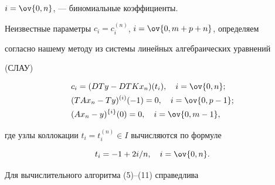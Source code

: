 $i=\ov{0,n}$, --- биномиальные коэффициенты. 


Неизвестные параметры $c_i=c^{(n)}_i$, $i=\ov{0,m+p+n}$, определяем 


согласно нашему методу из системы линейных алгебраических уравнений 


(СЛАУ) 


\begin{align} 


& c_i=(D T y-D T K x_n)(t_i),\quad i=\ov{0,n};\notag \\ 


& (T A x_n-T y)^{(i)}(-1)=0,\quad i=\ov{0,p-1};\\ 


& (A x_n-y)^{\{i\}}(0)=0,\quad i=\ov{0,m-1},\notag 


\end{align} 


где узлы коллокации $t_i=t^{(n)}_i\in I$ вычисляются по формуле 


\begin{equation} 


t_i=-1+2i/n,\quad i=\ov{0,n}. 


\end{equation} 


 


Для вычислительного алгоритма (5)--(11) справедлива 


 


